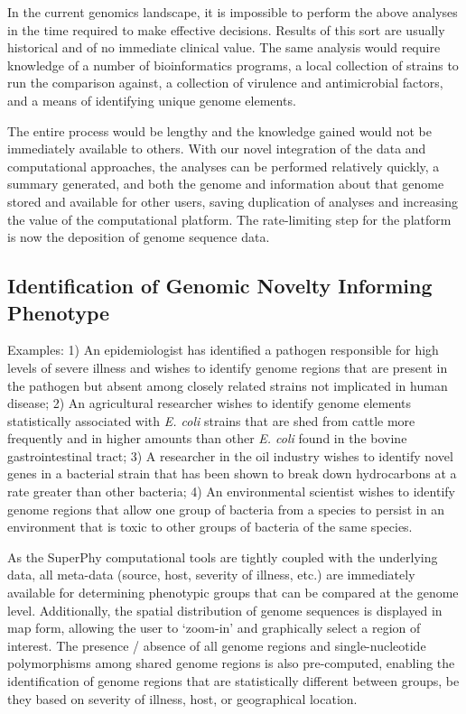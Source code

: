 \documentclass[a4paper,twoside]{article}
\begin{document}
In the current genomics landscape, it is impossible to perform the above analyses in the time required to make effective decisions. Results of this sort are usually historical and of no immediate clinical value. The same analysis would require knowledge of a number of bioinformatics programs, a local collection of strains to run the comparison against, a collection of virulence and antimicrobial factors, and a means of identifying unique genome elements.

The entire process would be lengthy and the knowledge gained would not be immediately available to others. With our novel integration of the data and computational approaches, the analyses can be performed relatively quickly, a summary generated, and both the genome and
information about that genome stored and available for other users, saving duplication of analyses and increasing the value of the computational platform. The rate-limiting step for the platform is now the deposition of genome sequence data.

\subsection{Identification of Genomic Novelty Informing Phenotype}
Examples: 1) An epidemiologist has identified a pathogen responsible for high levels of severe illness and wishes to identify genome regions that are present in the pathogen but absent among closely related strains not implicated in human disease; 2) An agricultural researcher wishes to identify genome elements statistically associated with \textit{E. coli} strains that are shed from cattle more frequently and in higher amounts than other \textit{E. coli} found in the bovine gastrointestinal tract; 3) A researcher in the oil industry wishes to identify novel genes in a bacterial strain that has been shown to break down hydrocarbons at a rate greater than other bacteria; 4) An environmental scientist wishes to identify genome regions that allow one group of bacteria from a species to persist in an environment that is toxic to other groups of bacteria of the same species.

As the SuperPhy computational tools are tightly coupled with the underlying data, all meta-data (source, host, severity of illness, etc.) are immediately available for determining phenotypic groups that can be compared at the genome level. Additionally, the spatial distribution of genome sequences is displayed in map form, allowing the user to `zoom-in' and graphically select a region of interest. The presence / absence of all genome regions and single-nucleotide polymorphisms among shared genome regions is also pre-computed, enabling the identification of genome regions that are statistically different between groups, be they based on severity of illness, host, or geographical location.
\end{document}
